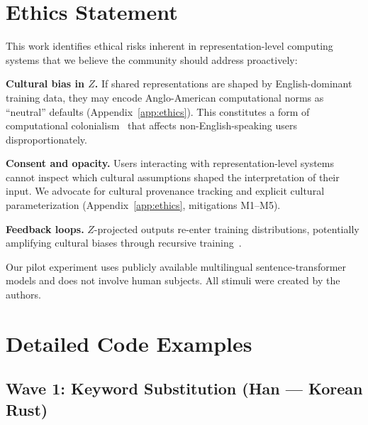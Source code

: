 \documentclass[11pt]{article}
\theoremstyle{definition}
\begin{document}

\section*{Ethics Statement}

This work identifies ethical risks inherent in representation-level computing systems that we believe the community should address proactively:

\textbf{Cultural bias in $Z$.} If shared representations are shaped by English-dominant training data, they may encode Anglo-American computational norms as ``neutral'' defaults (Appendix~\ref{app:ethics}). This constitutes a form of computational colonialism~\cite{phillipson1992} that affects non-English-speaking users disproportionately.

\textbf{Consent and opacity.} Users interacting with representation-level systems cannot inspect which cultural assumptions shaped the interpretation of their input. We advocate for cultural provenance tracking and explicit cultural parameterization (Appendix~\ref{app:ethics}, mitigations M1--M5).

\textbf{Feedback loops.} $Z$-projected outputs re-enter training distributions, potentially amplifying cultural biases through recursive training~\cite{shumailov2024collapse}.

Our pilot experiment uses publicly available multilingual sentence-transformer models and does not involve human subjects. All stimuli were created by the authors.





\appendix

\section{Detailed Code Examples}\label{app:code}

\subsection{Wave 1: Keyword Substitution (Han --- Korean Rust)}
\end{document}
